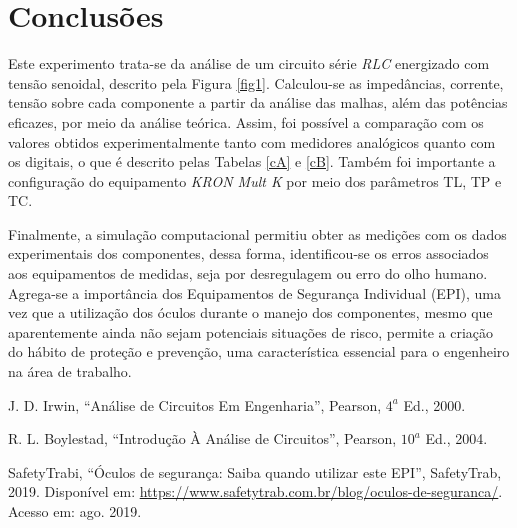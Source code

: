 \documentclass[a4paper,12pt,oneside,openany,table,xcdraw]{article}
\begin{document}
\section{Conclusões} %
Este experimento trata-se da análise de um circuito série \emph{RLC} energizado com tensão senoidal, descrito pela Figura \ref{fig1}. Calculou-se as impedâncias, corrente, tensão sobre cada componente a partir da análise das malhas, além das potências eficazes, por meio da análise teórica. Assim, foi possível a comparação com os valores obtidos experimentalmente tanto com medidores analógicos quanto com os digitais, o que é descrito pelas Tabelas \ref{cA} e \ref{cB}. Também foi importante a configuração do equipamento \emph{KRON Mult K} por meio dos parâmetros TL, TP e TC. 

Finalmente, a simulação computacional permitiu obter as medições com os dados experimentais dos componentes, dessa forma, identificou-se os erros associados aos equipamentos de medidas, seja por desregulagem ou erro do olho humano. Agrega-se a importância dos Equipamentos de Segurança Individual (EPI), uma vez que a utilização dos óculos durante o manejo dos componentes, mesmo que aparentemente ainda não sejam potenciais situações de risco, permite a criação do hábito de proteção e prevenção, uma característica essencial para o engenheiro na área de trabalho.


\newpage
\begin{thebibliography}{9} 
    J. D. Irwin,
    “Análise de Circuitos Em Engenharia”, Pearson, $4^a$ Ed., 2000.

    R. L. Boylestad,
    “Introdução À Análise de Circuitos”, Pearson, $10^a$ Ed., 2004.

    SafetyTrabi,
    “Óculos de segurança: Saiba quando utilizar este EPI”, SafetyTrab, 2019.
 Disponível em:
 \url{https://www.safetytrab.com.br/blog/oculos-de-seguranca/}. Acesso em: ago. 2019.


\end{thebibliography}
\end{document}
